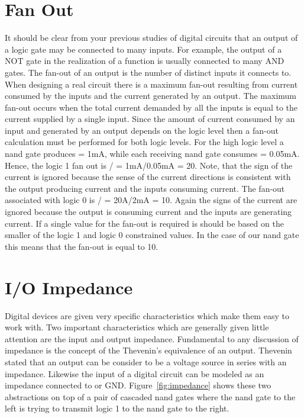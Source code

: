         \section{Fan Out}
            It should be clear from your previous studies of digital circuits
            that an output of a logic gate may be connected to many inputs.  For
            example, the output of a NOT gate in the \SOPmin realization of a
            function is usually connected to many AND gates.  The fan-out of an
            output is the number of distinct inputs it connects to.  When
            designing a real circuit there is a maximum fan-out
            resulting from current consumed by the inputs and the current generated
            by an output.  The maximum fan-out occurs when the total current demanded
            by all the inputs is equal to the current supplied by a single input.
            Since the amount of current consumed by an input and generated by an
            output depends on the logic level then a fan-out calculation must
            be performed for both logic levels.  For the high logic level a nand
            gate produces \IOH = 1mA, while each receiving nand gate consumes
            \IIH = 0.05mA.  Hence, the logic 1 fan out is \IOH / \IIH = 1mA/0.05mA = 20.
            Note, that the sign of the current is ignored because the sense of the
            current directions is consistent with
            the output producing current and the inputs consuming current.  The fan-out
            associated with logic 0 is \IOL / \IIL = 20A/2mA = 10.  Again the signs
            of the current are ignored because the output is consuming current and the
            inputs are generating current.  If a single value for the fan-out
            is required is should be based on the smaller of the logic 1 and logic 0
            constrained values.  In the case of our nand gate this means that
            the fan-out is equal to 10.

            \section{I/O Impedance}
            Digital devices are given very specific characteristics which make them
            easy to work with.  Two important characteristics which are
            generally given little attention are the input and output impedance.
            Fundamental to any discussion of impedance is the concept of the
            Thevenin's equivalence of an output.  Thevenin stated that an output
            can be consider to be a voltage source in series with an impedance.
            Likewise the input of a digital circuit can be modeled as an
            impedance connected to \VCC or GND.  Figure~\ref{fig:impedance} shows
            these two abstractions on top of a pair of cascaded nand gates where
            the nand gate to the left is trying to transmit logic 1 to the
            nand gate to the right.

